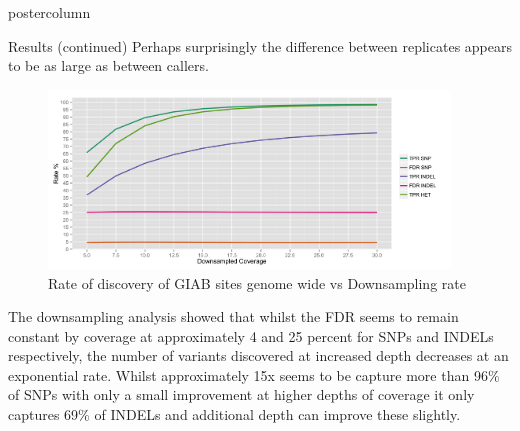 \documentclass[final,xcolor=table]{beamer}
\begin{document}
\begin{frame}{}
\begin{columns}
\begin{column}{.49\textwidth}
\begin{beamercolorbox}[center,wd=\textwidth]{postercolumn}
\begin{minipage}[T]{.95\textwidth}
\begin{block}{Results (continued)}
                Perhaps surprisingly the difference between replicates appears to be as large as between callers.
                
                \begin{figure}
                \includegraphics[width=0.95\textwidth]{images/downsampling_fig1}
                \caption{Rate of discovery of GIAB sites genome wide vs Downsampling rate}
                \end{figure}

                The downsampling analysis showed that whilst the FDR seems to remain constant by coverage at approximately 4 and 25 percent for SNPs and INDELs respectively, the number of variants discovered at increased depth decreases at an exponential rate.  Whilst approximately 15x seems to be capture more than 96\% of SNPs with only a small improvement at higher depths of coverage it only captures 69\% of INDELs and additional depth can improve these slightly.


\end{block}
\end{minipage}
\end{beamercolorbox}
\end{column}
\end{columns}
\end{frame}
\end{document}
